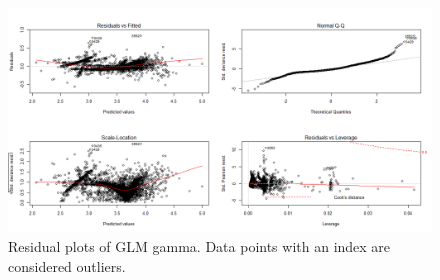 \begin{figure}[H]
  \includegraphics[width=\textwidth]{residuals_glm_gamma.png}
  \caption{Residual plots of GLM gamma. Data points with an index are considered outliers.}
  \label{fig:Residuals GLM gamma}
\end{figure}
